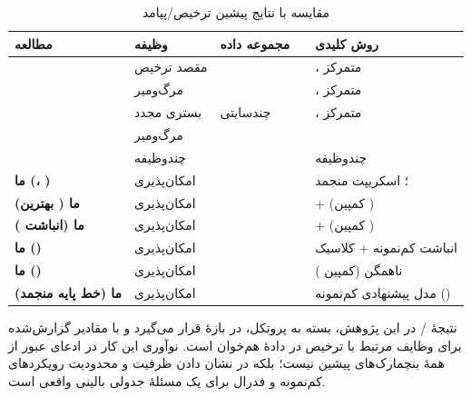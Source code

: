 \begin{table}[htbp]
\centering
\caption{مقایسه با نتایج پیشین ترخیص/پیامد}
\footnotesize
\setlength{\tabcolsep}{2pt}
\renewcommand{\arraystretch}{1.16}
\begin{tabularx}{\linewidth}{@{}L{2.55cm}R{1.85cm}C{2.15cm}C{1.35cm}Y@{}}
\toprule
\textbf{مطالعه} & \textbf{وظیفه} & \textbf{مجموعه داده} & \textbf{} & \textbf{روش کلیدی} \\
\midrule
{} & مقصد ترخیص &  &  & ، متمرکز \\
 & مرگ‌ومیر &  &  & ، متمرکز \\
 & بستری مجدد & چندسایتی &  & ، متمرکز \\
 & مرگ‌ومیر &  &  &  \\
 & چندوظیفه &  &  &  چندوظیفه \\
\textbf{ما (، )} & امکان‌پذیری &  &  & ؛ اسکریپت منجمد  \\
\textbf{ما ( بهترین)} & امکان‌پذیری &  &  & + (کمپین ) \\
\textbf{ما (انباشت )} & امکان‌پذیری &  &  & + (کمپین ) \\
\textbf{ما ()} & امکان‌پذیری &  & \textbf{} & انباشت کم‌نمونه + کلاسیک \\
\textbf{ما ()} & امکان‌پذیری &  &  &  ناهمگن (کمپین ) \\
\textbf{ما (خط پایه منجمد)} & امکان‌پذیری &  &  & مدل پیشنهادی کم‌نمونه () \\
\bottomrule
\end{tabularx}
\label{tab:discharge_comparison}
\end{table}

نتیجۀ / در این پژوهش، بسته به پروتکل، در بازۀ  قرار می‌گیرد و با مقادیر گزارش‌شده برای وظایف مرتبط با ترخیص در دادۀ  هم‌خوان است. نوآوری این کار در ادعای عبور از همۀ بنچمارک‌های پیشین نیست؛ بلکه در نشان دادن ظرفیت و محدودیت رویکردهای کم‌نمونه و فدرال برای یک مسئلۀ جدولی بالینی واقعی است.

